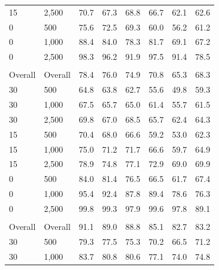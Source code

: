 \documentclass{article}\usepackage[]{graphicx}\usepackage[]{xcolor}
\newenvironment{knitrout}{}{} %
\begin{document}
\begin{knitrout}
\begin{landscape}
\begin{longtable}[t]{llcccccc}
\hspace{1em}15 & 2,500 & 70.7 & 67.3 & 68.8 & 66.7 & 62.1 & 62.6\\
\hspace{1em}0 & 500 & 75.6 & 72.5 & 69.3 & 60.0 & 56.2 & 61.2\\
\hspace{1em}0 & 1,000 & 88.4 & 84.0 & 78.3 & 81.7 & 69.1 & 67.2\\
\hspace{1em}0 & 2,500 & 98.3 & 96.2 & 91.9 & 97.5 & 91.4 & 78.5\\
\addlinespace[0.3em]
\multicolumn{8}{l}{\textit{\textbf{Combination effects}}}\\
\hline
\hspace{1em}Overall & Overall & 78.4 & 76.0 & 74.9 & 70.8 & 65.3 & 68.3\\
\hspace{1em}30 & 500 & 64.8 & 63.8 & 62.7 & 55.6 & 49.8 & 59.3\\
\hspace{1em}30 & 1,000 & 67.5 & 65.7 & 65.0 & 61.4 & 55.7 & 61.5\\
\hspace{1em}30 & 2,500 & 69.8 & 67.0 & 68.5 & 65.7 & 62.4 & 64.3\\
\hspace{1em}15 & 500 & 70.4 & 68.0 & 66.6 & 59.2 & 53.0 & 62.3\\
\hspace{1em}15 & 1,000 & 75.0 & 71.2 & 71.7 & 66.6 & 59.7 & 64.9\\
\hspace{1em}15 & 2,500 & 78.9 & 74.8 & 77.1 & 72.9 & 69.0 & 69.9\\
\hspace{1em}0 & 500 & 84.0 & 81.4 & 76.5 & 66.5 & 61.7 & 67.4\\
\hspace{1em}0 & 1,000 & 95.4 & 92.4 & 87.8 & 89.4 & 78.6 & 76.3\\
\hspace{1em}0 & 2,500 & 99.8 & 99.3 & 97.9 & 99.6 & 97.8 & 89.1\\
\addlinespace[0.3em]
\multicolumn{8}{l}{\textit{\textbf{Main effects}}}\\
\hline
\hspace{1em}Overall & Overall & 91.1 & 89.0 & 88.8 & 85.1 & 82.7 & 83.2\\
\hspace{1em}30 & 500 & 79.3 & 77.5 & 75.3 & 70.2 & 66.5 & 71.2\\
\hspace{1em}30 & 1,000 & 83.7 & 80.8 & 80.6 & 77.1 & 74.0 & 74.8\\

\end{longtable}
\end{landscape}
\end{knitrout}
\end{document}
